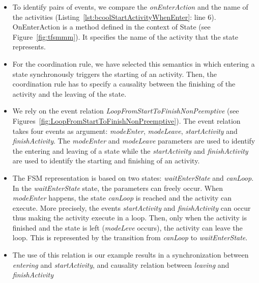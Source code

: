 \begin{itemize}
		 \item To identify pairs of events, we compare the \emph{onEnterAction} and the name of the activities (Listing~\ref{lst:bcoolStartActivityWhenEnter}: line 6). OnEnterAction is a method defined in the context of State (see Figure~\ref{fig:tfsmmm}). It specifies the name of the activity that the state represents. 
		  
		 
		 \item For the coordination rule, we have selected this semantics in which entering a state synchronously triggers the starting of an activity. Then, the coordination rule has to specify a causality between the finishing of the activity and the leaving of the state. 
		 
		 \item We rely on the event relation \emph{LoopFromStartToFinishNonPeemptive} (see Figures~\ref{fig:LoopFromStartToFinishNonPreemptive}). The event relation takes four events as argument: \emph{modeEnter}, \emph{modeLeave}, \emph{startActivity}  and \emph{finishActivity}. The \emph{modeEnter} and \emph{modeLeave} parameters are used to identify the entering and leaving of a state while the \emph{startActivity} and \emph{finishActivity} are used to identify the starting and finishing of an activity. 
		 
		 \item The FSM representation is based on two states: \emph{waitEnterState} and \emph{canLoop}. In the \emph{waitEnterState} state, the parameters can freely occur. When \emph{modeEnter} happens, the state \emph{canLoop} is reached and the activity can execute. More precisely, the events \emph{startActivity} and \emph{finishActivity} can occur thus making the activity execute in a loop. Then, only when the activity is finished and the state is left (\emph{modeLeve} occurs), the activity can leave the loop. This is represented by the transition from \emph{canLoop} to \emph{waitEnterState}.
		 
		 \item The use of this relation is our example results in a synchronization between \dse \emph{entering} and \emph{startActivity}, and causality relation between \dse \emph{leaving} and \emph{finishActivity}    
		 
		
		

\end{itemize}

